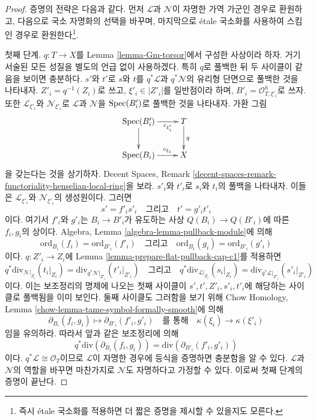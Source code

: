 \begin{proof}
증명의 전략은 다음과 같다. 먼저 $\mathcal{L}$과 $\mathcal{N}$이
자명한 가역 가군인 경우로 환원하고, 다음으로 국소 자명화의 선택을
바꾸며, 마지막으로 \'etale 국소화를 사용하여 스킴인 경우로
환원한다\footnote{즉시 \'etale 국소화를 적용하면 더 짧은 증명을
제시할 수 있을지도 모른다.}.

\medskip\noindent
첫째 단계. $q : T \to X$를 Lemma \ref{lemma-Gm-torsor}에서 구성한
사상이라 하자. 거기 서술된 모든 성질을 별도의 언급 없이 사용하겠다.
특히 $q$로 풀백한 뒤 두 사이클이 같음을 보이면 충분하다.
$s'$와 $t'$로 $s$와 $t$를 $q^*\mathcal{L}$과
$q^*\mathcal{N}$의 유리형 단면으로 풀백한 것을 나타내자.
$Z'_i = q^{-1}(Z_i)$로 쓰고, $\xi'_i \in |Z'_i|$를 일반점이라 하며,
$B'_i = \mathcal{O}_{T, \xi'_i}^h$로 쓰자. 또한
$\mathcal{L}_{\xi'_i}$와 $\mathcal{N}_{\xi'_i}$로
$\mathcal{L}$과 $\mathcal{N}$을 $\mathop{\mathrm{Spec}}(B'_i)$로 풀백한 것을 나타내자.
가환 그림
$$
\xymatrix{
\Spec(B'_i) \ar[r]_-{c_{\xi'_i}} \ar[d] & T \ar[d]^q \\
\Spec(B_i) \ar[r]^-{c_{\xi_i}} & X
}
$$
을 갖는다는 것을 상기하자. Decent Spaces, Remark
\ref{decent-spaces-remark-functoriality-henselian-local-ring}을 보라.
$s'_i$와 $t'_i$로 $s_i$와 $t_i$의 풀백을 나타내자. 이들은
$\mathcal{L}_{\xi'_i}$와 $\mathcal{N}_{\xi'_i}$의 생성원이다. 그러면
$$
s' = f'_i s'_i
\quad\text{그리고}\quad
t' = g'_i t'_i
$$
이다. 여기서 $f'_i$와 $g'_i$는 $B_i \to B'_i$가 유도하는 사상
$Q(B_i) \to Q(B'_i)$에 따른 $f_i, g_i$의 상이다. Algebra, Lemma
\ref{algebra-lemma-pullback-module}에 의해
$$
\text{ord}_{B_i}(f_i) = \text{ord}_{B'_i}(f'_i)
\quad\text{그리고}\quad
\text{ord}_{B_i}(g_i) = \text{ord}_{B'_i}(g'_i)
$$
이다. $q : Z'_i \to Z_i$에 Lemma
\ref{lemma-prepare-flat-pullback-cap-c1}를 적용하면
$$
q^*\text{div}_{\mathcal{N}|_{Z_i}}(t_i|_{Z_i}) =
\text{div}_{q^*\mathcal{N}|_{Z'_i}}(t'_i|_{Z'_i})
\quad\text{그리고}\quad
q^*\text{div}_{\mathcal{L}|_{Z_i}}(s_i|_{Z_i}) =
\text{div}_{q^*\mathcal{L}|_{Z'_i}}(s'_i|_{Z'_i})
$$
이다. 이는 보조정리의 명제에 나오는 첫째 사이클이
$s', t', Z'_i, s'_i, t'_i$에 해당하는 사이클로 풀백됨을 이미 보인다.
둘째 사이클도 그러함을 보기 위해 Chow Homology, Lemma
\ref{chow-lemma-tame-symbol-formally-smooth}에 의해
$$
\partial_{B_i}(f_i, g_i) \mapsto
\partial_{B'_i}(f'_i, g'_i)
\quad\text{를 통해}\quad
\kappa(\xi_i) \to \kappa(\xi'_i)
$$
임을 유의하라. 따라서 앞과 같은 보조정리에 의해
$$
q^*\text{div}(\partial_{B_i}(f_i, g_i)) =
\text{div}(\partial_{B'_i}(f'_i, g'_i))
$$
이다. $q^*\mathcal{L} \cong \mathcal{O}_T$이므로
$\mathcal{L}$이 자명한 경우에 등식을 증명하면 충분함을 알 수 있다.
$\mathcal{L}$과 $\mathcal{N}$의 역할을 바꾸면 마찬가지로
$\mathcal{N}$도 자명하다고 가정할 수 있다. 이로써 첫째 단계의
증명이 끝난다.


\end{proof}
